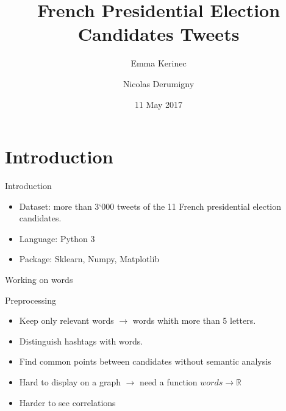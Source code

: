 \documentclass{beamer}
\title[DM-Project 2]{French Presidential Election Candidates Tweets}
\author[E. Kerinec and N. Derumigny]{Emma Kerinec \and Nicolas Derumigny}
\institute[]{ENS Lyon}
\date{11 May 2017}
\begin{document}
\begin{frame}
	\titlepage
	\begin{center}
	\end{center}
\end{frame}



\section{Introduction}
\begin{frame}{Introduction}
\begin{itemize}
\item Dataset: more than 3`000 tweets of the 11 French presidential election candidates.
\item Language: Python 3
\item Package: Sklearn, Numpy, Matplotlib
\end{itemize}

\end{frame}

\begin{frame}{Working on words}
\begin{block}{Preprocessing}
\begin{itemize}
\item Keep only relevant words $\to$ words whith more than 5 letters.
\item Distinguish hashtags with words.
\item Find common points between candidates without semantic analysis
\end{itemize}
\end{block}
\begin{itemize}
\item Hard to display on a graph $\to$ need a function $words \to \mathbb{R}$
\item Harder to see correlations
\end{itemize}
\end{frame}
\end{document}
